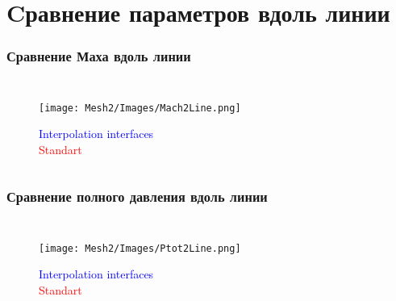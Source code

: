 \documentclass[c, aspectratio = 169]{beamer}
\begin{document}
    
    
    
    
    
            \section{Cравнение параметров вдоль линии} 
            \begin{frame}
            \frametitle{Сравнение Маха вдоль линии}
            \begin{columns}[c]
                
                \vspace{-0.4cm}
                
                    \begin{figure}
                        \texttt{[image: Mesh2/Images/Mach2Line.png]}
                        \caption{\textcolor{blue}{Interpolation interfaces}\\
                        \textcolor{red}{Standart} }   
                    \end{figure}   
            
                
            
                
                
            \end{columns}
            \end{frame}
                    
    \begin{frame}
        \frametitle{Сравнение полного давления вдоль линии}
        \begin{columns}[c]
            
            \vspace{-0.4cm}
            
                \begin{figure}
                    \texttt{[image: Mesh2/Images/Ptot2Line.png]}
                    \caption{\textcolor{blue}{Interpolation interfaces}\\
                    \textcolor{red}{Standart} }   
                \end{figure}  
            \end{columns}
        \end{frame}
                                
\end{document}
